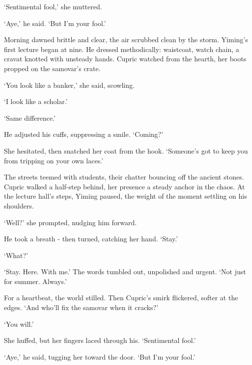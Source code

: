 `Sentimental fool,' she muttered.

`Aye,' he said. `But I'm your fool.'

Morning dawned brittle and clear, the air scrubbed clean by the storm. Yiming's first lecture began at nine. He dressed methodically: waistcoat, watch chain, a cravat knotted with unsteady hands. Cupric watched from the hearth, her boots propped on the samovar's crate.

`You look like a banker,' she said, scowling.

`I look like a scholar.'

`Same difference.'

He adjusted his cuffs, suppressing a smile. `Coming?'

She hesitated, then snatched her coat from the hook. `Someone's got to keep you from tripping on your own laces.'

The streets teemed with students, their chatter bouncing off the ancient stones. Cupric walked a half-step behind, her presence a steady anchor in the chaos. At the lecture hall's steps, Yiming paused, the weight of the moment settling on his shoulders.

`Well?' she prompted, nudging him forward.

He took a breath - then turned, catching her hand. `Stay.'

`What?'

`Stay. Here. With me.' The words tumbled out, unpolished and urgent. `Not just for summer. Always.'

For a heartbeat, the world stilled. Then Cupric's smirk flickered, softer at the edges. `And who'll fix the samovar when it cracks?'

`You will.'

She huffed, but her fingers laced through his. `Sentimental fool.'

`Aye,' he said, tugging her toward the door. `But I'm your fool.'